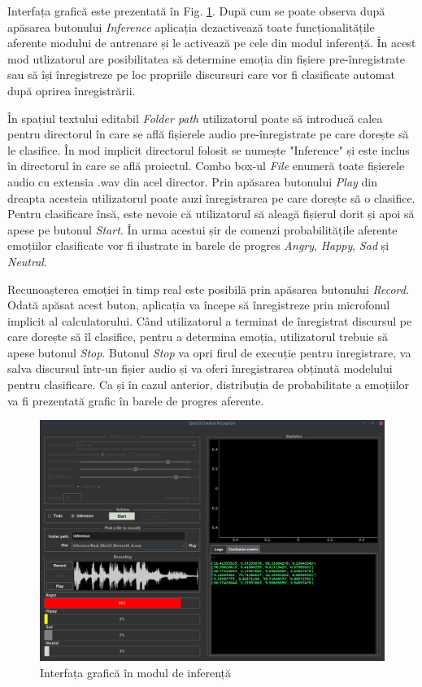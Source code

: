 \documentclass[a4paper,12pt]{book}
\begin{document}
		Interfața grafică este prezentată în Fig. \ref{fig:gui_inf}. După cum se poate observa după apăsarea butonului \textit{Inference}
		aplicația dezactivează toate funcționalitățile aferente modului de antrenare și le activează pe cele din modul inferență. În acest mod utlizatorul are posibilitatea să determine emoția din fișiere pre-înregistrate sau să își înregistreze pe loc propriile discursuri care vor fi clasificate automat după oprirea înregistrării. \par
		
		În spațiul textului editabil \textit{Folder path} utilizatorul poate să introducă calea pentru directorul în care se află fișierele audio pre-înregistrate pe care dorește să le clasifice. În mod implicit directorul folosit se numește "Inference" și este inclus în directorul în care se află proiectul. Combo box-ul \textit{File} enumeră toate fișierele audio cu extensia .wav din acel director. Prin apăsarea butonului \textit{Play} din dreapta acesteia utilizatorul poate auzi înregistrarea pe care dorește să o clasifice. Pentru clasificare însă, este nevoie că utilizatorul să aleagă fișierul dorit și apoi să apese pe butonul \textit{Start}. În urma acestui șir de comenzi probabilitățile aferente emoțiilor clasificate vor fi ilustrate in barele de progres \textit{Angry},  \textit{Happy}, \textit{Sad} și \textit{Neutral}. \par
		Recunoașterea emoției în timp real este posibilă prin apăsarea butonului \textit{Record}. Odată apăsat acest buton, aplicația va începe să înregistreze prin microfonul implicit al calculatorului. Când utilizatorul a terminat de înregistrat discursul pe care dorește să îl clasifice, pentru a determina emoția, utilizatorul trebuie să apese butonul \textit{Stop}. Butonul \textit{Stop} va opri firul de execuție pentru inregistrare, va salva discursul într-un fișier audio și va oferi înregistrarea obținută modelului pentru clasificare. Ca și în cazul anterior, distribuția de probabilitate a emoțiilor va fi prezentată grafic în barele de progres aferente. \par
		\begin{figure}[h]
			\hspace{-0.3cm}
			\includegraphics[scale=0.35]{gui_inf}
			\caption{Interfața grafică în modul de inferență}
			\label{fig:gui_inf}
		\end{figure} 
\end{document}
